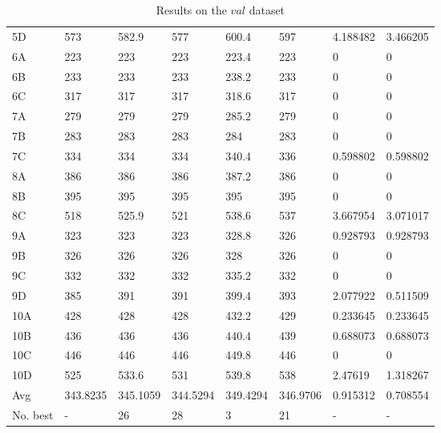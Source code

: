 \documentclass[conference]{IEEEtran}
\begin{document}
\begin{table}[h]
{\begin{tabular}{llllllll}
            5D    & 573      & 582.9    & 577      & 600.4    & 597      & 4.188482 & 3.466205 \\
            6A    & 223      & 223      & 223      & 223.4    & 223      & 0        & 0        \\
            6B    & 233      & 233      & 233      & 238.2    & 233      & 0        & 0        \\
            6C    & 317      & 317      & 317      & 318.6    & 317      & 0        & 0        \\
            7A    & 279      & 279      & 279      & 285.2    & 279      & 0        & 0        \\
            7B    & 283      & 283      & 283      & 284      & 283      & 0        & 0        \\
            7C    & 334      & 334      & 334      & 340.4    & 336      & 0.598802 & 0.598802 \\
            8A    & 386      & 386      & 386      & 387.2    & 386      & 0        & 0        \\
            8B    & 395      & 395      & 395      & 395      & 395      & 0        & 0        \\
            8C    & 518      & 525.9    & 521      & 538.6    & 537      & 3.667954 & 3.071017 \\
            9A    & 323      & 323      & 323      & 328.8    & 326      & 0.928793 & 0.928793 \\
            9B    & 326      & 326      & 326      & 328      & 326      & 0        & 0        \\
            9C    & 332      & 332      & 332      & 335.2    & 332      & 0        & 0        \\
            9D    & 385      & 391      & 391      & 399.4    & 393      & 2.077922 & 0.511509 \\
            10A   & 428      & 428      & 428      & 432.2    & 429      & 0.233645 & 0.233645 \\
            10B   & 436      & 436      & 436      & 440.4    & 439      & 0.688073 & 0.688073 \\
            10C   & 446      & 446      & 446      & 449.8    & 446      & 0        & 0        \\
            10D   & 525      & 533.6    & 531      & 539.8    & 538      & 2.47619  & 1.318267 \\
            Avg      & 343.8235 & 345.1059 & 344.5294 & 349.4294 & 346.9706 & 0.915312 & 0.708554 \\
            No. best & -        & 26       & 28       & 3        & 21       & -        & -        \\
            \bottomrule
        \end{tabular}
    }
    \caption{Results on the $val$ dataset}
    \label{tab:val}
\end{table}
\end{document}
